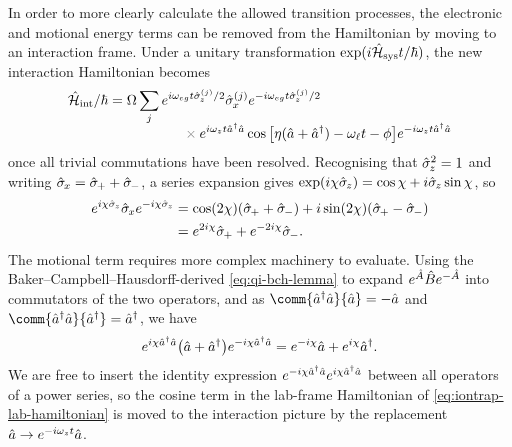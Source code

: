 In order to more clearly calculate the allowed transition processes, the electronic and motional energy terms can be removed from the Hamiltonian by moving to an interaction frame.
Under a unitary transformation $\exp(i\hat{\mathcal H}_{\text{sys}}t/\hbar)$, the new interaction Hamiltonian becomes
\begin{equation}\label{eq:iontrap-interaction-transform-hamiltonian}\begin{aligned}
\H_{\text{int}}/\hbar =
    {}&\Omega\sum_j e^{i\omega_{eg}t\sz^{(j)}/2}\sx^{(j)}e^{-i\omega_{eg}t\sz^{(j)}/2}\\[-0.5em]
        &\qquad\qquad\mathbin{\textcolor{fade}{\times}} e^{i\omega_zt\a^\dagger\a}\cos\big[\eta(\a + \a^\dagger) - \omega_\ell t - \phi\big]e^{-i\omega_zt\a^\dagger\a}
\end{aligned}\end{equation}
once all trivial commutations have been resolved.
Recognising that $\hat{\sigma}_{\mkern-1mu z}^2 = 1$ and writing $\hat{\sigma}_{\mkern-1mu x} = \hat{\sigma}_{\mkern-1mu+} + \hat{\sigma}_{\mkern-1mu-}$, a series expansion gives $\exp(i\chi\hat{\sigma}_{\mkern-1mu z}) = \cos\chi + i\hat{\sigma}_{\mkern-1mu z}\sin\chi$, so
\begin{equation}\begin{aligned}
e^{i\chi\hat{\sigma}_{\mkern-1mu z}}\hat{\sigma}_{\mkern-1mu x} e^{-i\chi\hat{\sigma}_{\mkern-1mu z}}
    &= \cos(2\chi)(\hat{\sigma}_{\mkern-1mu+} + \hat{\sigma}_{\mkern-1mu-}) + i\sin(2\chi)(\hat{\sigma}_{\mkern-1mu+} - \hat{\sigma}_{\mkern-1mu-})\\
    &= e^{2i\chi}\hat{\sigma}_{\mkern-1mu+} + e^{-2i\chi}\hat{\sigma}_{\mkern-1mu-}.
\end{aligned}\end{equation}
The motional term requires more complex machinery to evaluate.
Using the Baker--Campbell--Hausdorff-derived \cref{eq:qi-bch-lemma} to expand $e^{\hat{A}}\hat{B} e^{-\hat{A}}$ into commutators of the two operators, and as $\comm{\a^\dagger\a}{\a} = -\a$ and $\comm{\a^\dagger\a}{\a^\dagger} = \a^\dagger$, we have
\begin{equation}
e^{i\chi\hat{a}^\dagger\hat{a}}\bigl(\hat{a} + \hat{a}^\dagger\bigr)e^{-i\chi\hat{a}^\dagger\hat{a}} = e^{-i\chi}\hat{a} + e^{i\chi}\hat{a}^\dagger.
\end{equation}
We are free to insert the identity expression $e^{-i\chi\hat{a}^\dagger\hat{a}}e^{i\chi\hat{a}^\dagger\hat{a}}$ between all operators of a power series, so the cosine term in the lab-frame Hamiltonian of \cref{eq:iontrap-lab-hamiltonian} is moved to the interaction picture by the replacement $\hat{a}\to e^{-i\omega_zt}\hat{a}$.

